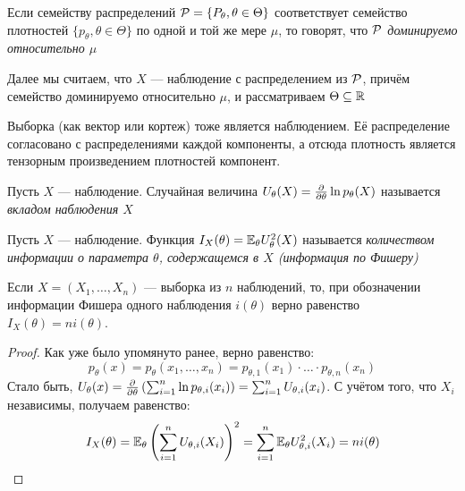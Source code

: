 \begin{definition}
	Если семейству распределений $\mathcal{P} = \{P_\theta, \theta \in \Theta\}$ соответствует семейство плотностей $\{p_\theta, \theta \in \Theta\}$ по одной и той же мере $\mu$, то говорят, что \textit{$\mathcal{P}$ доминируемо относительно $\mu$}
\end{definition}

\begin{note}
	Далее мы считаем, что $X$ --- наблюдение с распределением из $\mathcal{P}$, причём семейство доминируемо относительно $\mu$, и рассматриваем $\Theta \subseteq \mathbb{R}$
\end{note}

\begin{note}
	Выборка (как вектор или кортеж) тоже является наблюдением. Её распределение согласовано с распределениями каждой компоненты, а отсюда плотность является тензорным произведением плотностей компонент.
\end{note}

\begin{definition}
	Пусть $X$ --- наблюдение. Случайная величина $U_\theta(X) = \frac{\partial }{\partial \theta}\ln p_\theta(X)$ называется \textit{вкладом наблюдения $X$}
\end{definition}


\begin{definition}
	Пусть $X$ --- наблюдение. Функция $I_X(\theta) = \mathbb{E}_\theta U_\theta^2(X)$ называется \textit{количеством информации о параметра $\theta$, содержащемся в $X$ (информация по Фишеру)}
\end{definition}

\begin{proposition}
	Если $X = (X_1, \ldots, X_n)$ --- выборка из $n$ наблюдений, то, при обозначении информации Фишера одного наблюдения $i(\theta)$ верно равенство $I_X(\theta) = ni(\theta)$.
\end{proposition}

\begin{proof}
	Как уже было упомянуто ранее, верно равенство:
	\[
		p_\theta(x) = p_\theta(x_1, \ldots, x_n) = p_{\theta, 1}(x_1) \cdot \ldots \cdot p_{\theta, n}(x_n)
	\]
	Стало быть, $U_\theta(x) = \frac{\partial }{\partial \theta} \left(\sum_{i = 1}^n \ln p_{\theta, i}(x_i)\right) = \sum_{i = 1}^n U_{\theta, i}(x_i)$. С учётом того, что $X_i$ независимы, получаем равенство:
	\[
		I_X(\theta) = \mathbb{E}_\theta \left(\sum_{i = 1}^n U_{\theta, i}(X_i)\right)^2 = \sum_{i = 1}^n \mathbb{E}_\theta U_{\theta, i}^2(X_i) = ni(\theta)
	\]
\end{proof}

